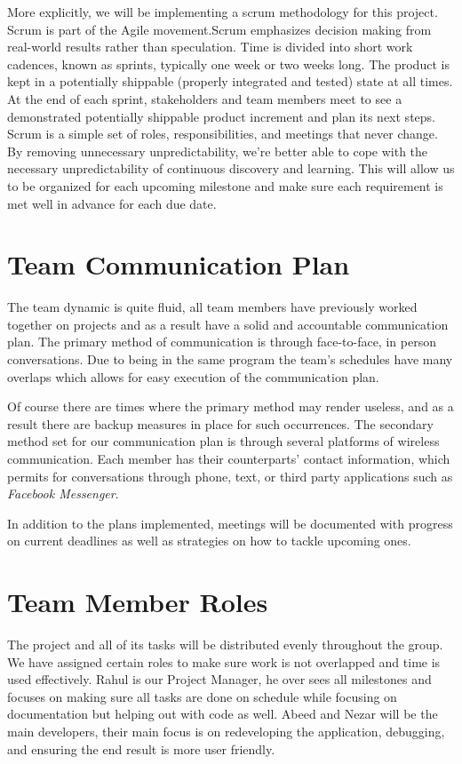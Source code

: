 \documentclass{article}
\begin{document}
\indent More explicitly, we will be implementing a scrum methodology for this project. Scrum is part of the Agile movement.Scrum emphasizes decision making from real-world results rather than speculation. Time is divided into short work cadences, known as sprints, typically one week or two weeks long. The product is kept in a potentially shippable (properly integrated and tested) state at all times. At the end of each sprint, stakeholders and team members meet to see a demonstrated potentially shippable product increment and plan its next steps. Scrum is a simple set of roles, responsibilities, and meetings that never change. By removing unnecessary unpredictability, we’re better able to cope with the necessary unpredictability of continuous discovery and learning. This will allow us to be organized for each upcoming milestone and make sure each requirement is met well in advance for each due date.

\section{Team Communication Plan}
\indent The team dynamic is quite fluid, all team members have previously worked together on projects and as a result have a solid and accountable communication plan. The primary method of communication is through face-to-face, in person conversations. Due to being in the same program the team's schedules have many overlaps which allows for easy execution of the communication plan. 

Of course there are times where the primary method may render useless, and as a result there are backup measures in place for such occurrences. The secondary method set for our communication plan is through several platforms of wireless communication. Each member has their counterparts' contact information, which permits for conversations through phone, text, or third party applications such as \textit{Facebook Messenger}.

In addition to the plans implemented, meetings will be documented with progress on current deadlines as well as strategies on how to tackle upcoming ones.

\section{Team Member Roles}
\indent The project and all of its tasks will be distributed evenly throughout the group. We have assigned certain roles to make sure work is not overlapped and time is used effectively. Rahul is our Project Manager, he over sees all milestones and focuses on making sure all tasks are done on schedule while focusing on documentation but helping out with code as well. Abeed and Nezar will be the main developers, their main focus is on redeveloping the application, debugging, and ensuring the end result is more user friendly.
\end{document}
